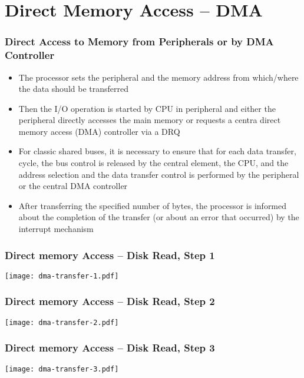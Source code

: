\documentclass{beamer}
\begin{document}
\section{Direct Memory Access -- DMA}

\begin{frame}
\frametitle{Direct Access to Memory from Peripherals or by DMA Controller}

\begin{itemize}
\item The processor sets the peripheral and the memory address from which/where the data should be transferred
\item Then the I/O operation is started by CPU in peripheral and either the peripheral
 directly accesses the main memory or requests a centra direct memory access (DMA)
 controller via a DRQ
\item For classic shared buses, it is necessary to ensure that for each data
 transfer, cycle, the bus control is released by the central element, the CPU,
 and the address selection and the data transfer control is performed by
 the peripheral or the central DMA controller
\item After transferring the specified number of bytes, the processor is informed
 about the completion of the transfer (or about an error that occurred)
 by the interrupt mechanism
\end{itemize}

\end{frame}

\begin{frame}
\frametitle{Direct memory Access -- Disk Read, Step 1}

\begin{center}
  \texttt{[image: dma-transfer-1.pdf]}
\end{center}

\end{frame}


\begin{frame}
\frametitle{Direct memory Access -- Disk Read, Step 2}

\begin{center}
  \texttt{[image: dma-transfer-2.pdf]}
\end{center}

\end{frame}

\begin{frame}
\frametitle{Direct memory Access -- Disk Read, Step 3}

\begin{center}
  \texttt{[image: dma-transfer-3.pdf]}
\end{center}

\end{frame}
\end{document}
